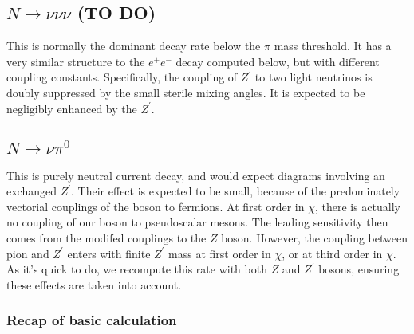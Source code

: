 \documentclass[11pt, a4paper]{article}
\begin{document}
\subsection{$N\to\nu\nu\nu$ (TO DO)}

This is normally the dominant decay rate below the $\pi$ mass threshold.  It
has a very similar structure to the $e^+e^-$ decay computed below, but with
different coupling constants.  Specifically, the coupling of $Z^\prime$ to two
light neutrinos is doubly suppressed by the small sterile mixing angles. It is
expected to be negligibly enhanced by the $Z^\prime$. 

\subsection{$N\to\nu\pi^0$}

This is purely neutral current decay, and would expect diagrams involving an
exchanged $Z^\prime$.
%
Their effect is expected to be small, because of the predominately vectorial
couplings of the boson to fermions. At first order in $\chi$, there is actually
no coupling of our boson to pseudoscalar mesons. The leading sensitivity then
comes from the modifed couplings to the $Z$ boson. However, the coupling
between pion and $Z^\prime$ enters with finite $Z^\prime$ mass at first order
in $\chi$, or at third order in $\chi$. As it's quick to do, we recompute this
rate with both $Z$ and $Z^\prime$ bosons, ensuring these effects are taken into
account.

\subsubsection{Recap of basic calculation}
\end{document}
